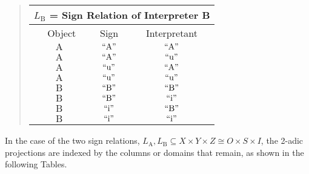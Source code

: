 \documentclass[12pt]{article}
\begin{document}
\begin{quote}\begin{tabular}{|c|c|c|}
\multicolumn{3}{c}{$L_{\mathrm{B}}$ = Sign Relation of Interpreter B} \\
\hline\
Object       & Sign            & Interpretant     \\
\hline\hline
$\mathrm{A}$ & $\mathrm{``A"}$ & $\mathrm{``A"}$  \\
\hline
$\mathrm{A}$ & $\mathrm{``A"}$ & $\mathrm{``u"}$  \\
\hline
$\mathrm{A}$ & $\mathrm{``u"}$ & $\mathrm{``A"}$  \\
\hline
$\mathrm{A}$ & $\mathrm{``u"}$ & $\mathrm{``u"}$  \\
\hline
$\mathrm{B}$ & $\mathrm{``B"}$ & $\mathrm{``B"}$  \\
\hline
$\mathrm{B}$ & $\mathrm{``B"}$ & $\mathrm{``i"}$  \\
\hline
$\mathrm{B}$ & $\mathrm{``i"}$ & $\mathrm{``B"}$  \\
\hline
$\mathrm{B}$ & $\mathrm{``i"}$ & $\mathrm{``i"}$  \\
\hline
\end{tabular}\end{quote}

In the case of the two sign relations, $L_{\mathrm{A}}, L_{\mathrm{B}} \subseteq X \times Y \times Z \cong O \times S \times I$, the 2-adic projections are indexed by the columns or domains that remain, as shown in the following Tables.
\end{document}
